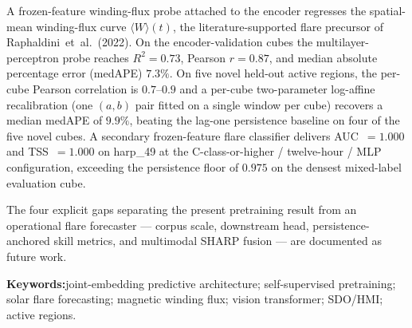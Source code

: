 \documentclass[11pt,a4paper]{article}
\begin{document}
A frozen-feature winding-flux probe attached to the encoder
regresses the spatial-mean winding-flux curve $\langle W \rangle(t)$,
the literature-supported flare precursor of
Raphaldini~et~al.\ (2022). On the encoder-validation cubes the
multilayer-perceptron probe reaches $R^{2} = 0.73$, Pearson
$r = 0.87$, and median absolute percentage error (medAPE) $7.3\%$.
On five novel held-out active regions, the per-cube Pearson
correlation is $0.7$--$0.9$ and a per-cube two-parameter log-affine
recalibration (one $(a, b)$ pair fitted on a single window per
cube) recovers a median medAPE of $9.9\%$, beating the lag-one
persistence baseline on four of the five novel cubes. A secondary
frozen-feature flare classifier delivers AUC~$=1.000$ and
TSS~$=1.000$ on harp\_49 at the C-class-or-higher / twelve-hour /
MLP configuration, exceeding the persistence floor of $0.975$ on
the densest mixed-label evaluation cube.

The four explicit gaps separating the present pretraining result
from an operational flare forecaster --- corpus scale, downstream
head, persistence-anchored skill metrics, and multimodal SHARP
fusion --- are documented as future work.

\vspace{0.6em}
\noindent\textbf{Keywords:}\quad joint-embedding predictive
architecture; self-supervised pretraining; solar flare
forecasting; magnetic winding flux; vision transformer; SDO/HMI;
active regions.
\end{document}
